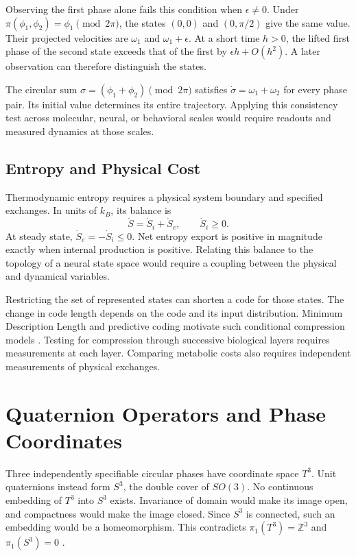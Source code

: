 \documentclass[12pt,a4paper]{article}
\begin{document}
Observing the first phase alone fails this condition when $\epsilon\ne0$. Under $\pi(\phi_1,\phi_2)=\phi_1\pmod{2\pi}$, the states $(0,0)$ and $(0,\pi/2)$ give the same value. Their projected velocities are $\omega_1$ and $\omega_1+\epsilon$. At a short time $h>0$, the lifted first phase of the second state exceeds that of the first by $\epsilon h+O(h^2)$. A later observation can therefore distinguish the states.

The circular sum $\sigma=(\phi_1+\phi_2)\pmod{2\pi}$ satisfies $\dot\sigma=\omega_1+\omega_2$ for every phase pair. Its initial value determines its entire trajectory. Applying this consistency test across molecular, neural, or behavioral scales would require readouts and measured dynamics at those scales.

\subsection{Entropy and Physical Cost}\label{app:entropy_balance}

Thermodynamic entropy requires a physical system boundary and specified exchanges. In units of $k_B$, its balance is \cite{Prigogine1977}
\begin{equation}\label{eq:entropy_balance}
 \dot S=\dot S_i+\dot S_e,\qquad \dot S_i\geq0.
\end{equation}
At steady state, $\dot S_e=-\dot S_i\leq0$. Net entropy export is positive in magnitude exactly when internal production is positive. Relating this balance to the topology of a neural state space would require a coupling between the physical and dynamical variables.

Restricting the set of represented states can shorten a code for those states. The change in code length depends on the code and its input distribution. Minimum Description Length and predictive coding motivate such conditional compression models \cite{LiVitanyi2008,RaoBallard1999,Prada2025}. Testing for compression through successive biological layers requires measurements at each layer. Comparing metabolic costs also requires independent measurements of physical exchanges.

\section{Quaternion Operators and Phase Coordinates}\label{sec:quaternions}

Three independently specifiable circular phases have coordinate space $T^3$. Unit quaternions instead form $S^3$, the double cover of $SO(3)$. No continuous embedding of $T^3$ into $S^3$ exists. Invariance of domain would make its image open, and compactness would make the image closed. Since $S^3$ is connected, such an embedding would be a homeomorphism. This contradicts $\pi_1(T^3)=\mathbb{Z}^3$ and $\pi_1(S^3)=0$ \cite{Hatcher2002}.
\end{document}
